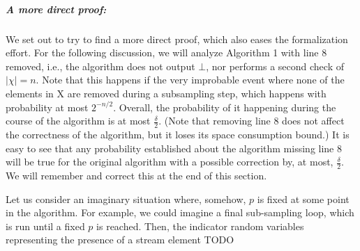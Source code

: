 \subparagraph*{A more direct proof:}
We set out to try to find a more direct proof, which also eases the formalization effort.
For the following discussion, we will analyze Algorithm 1 with line 8 removed, i.e., the algorithm does not output $\bot$, nor performs a second check of $|\chi|=n$.
Note that this happens if the very improbable event where none of the elements in X are removed during a subsampling step, which happens with probability at most $2^{-n/2}$.
Overall, the probability of it happening during the course of the algorithm is at most $\frac{\delta}{2}$. (Note that removing line 8 does not affect the correctness of the algorithm, but it loses its space consumption bound.)
It is easy to see that any probability established about the algorithm missing line 8 will be true for the original algorithm with a possible correction by, at most,  $\frac{\delta}{2}$.
We will remember and correct this at the end of this section.

Let us consider an imaginary situation where, somehow, $p$ is fixed at some point in the algorithm.
For example, we could imagine a final sub-sampling loop, which is run until a fixed $p$ is reached.
Then, the indicator random variables representing the presence of a stream element TODO

